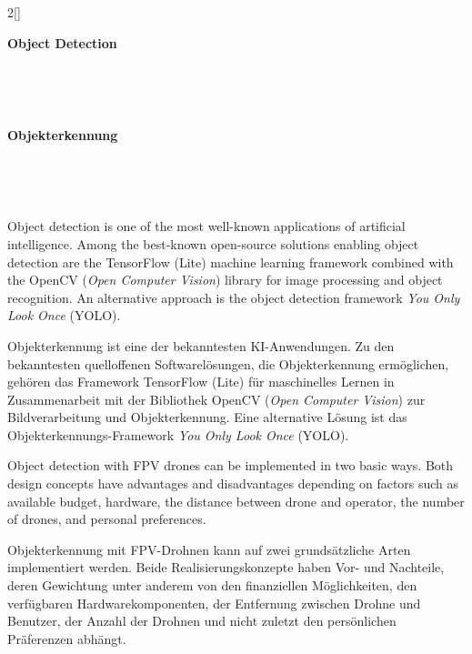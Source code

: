 \renewcommand{\deutschertitel}{Objekterkennung}
\renewcommand{\englischertitel}{Object Detection}
\chapter[\texorpdfstring{\protect{\vspace{2pt}\englischertitel}}{\englischertitel}]{}
\kapitel{\deutschertitel}
\thispagestyle{empty}

\label{KapitelObjekterkennung}

\begin{paracol}{2}[]

{\raggedright\huge\bfseries\sffamily \englischertitel \par\ } \\[1.8ex]

\switchcolumn

{\raggedright\huge\bfseries\sffamily \deutschertitel \par\ } \\[1.8ex]

\coleng

Object detection is one of the most well-known applications of artificial intelligence. Among the best-known open-source solutions enabling object detection are the TensorFlow (Lite) machine learning framework combined with the OpenCV (\textsl{Open Computer Vision}) library for image processing and object recognition. An alternative approach is the object detection framework \textsl{You Only Look Once} (YOLO).

\colger

Objekterkennung ist eine der bekanntesten KI-Anwendungen. Zu den bekanntesten quelloffenen Softwarelösungen, die Objekterkennung ermöglichen, gehören das Framework TensorFlow (Lite) für maschinelles Lernen in Zusammenarbeit mit der Bibliothek OpenCV (\textsl{Open Computer Vision}) zur Bildverarbeitung und Objekterkennung. Eine alternative Lösung ist das Objekterkennungs-Framework \textsl{You Only Look Once} (YOLO).

\coleng

Object detection with FPV drones can be implemented in two basic ways. Both design concepts have advantages and disadvantages depending on factors such as available budget, hardware, the distance between drone and operator, the number of drones, and personal preferences.

\colger

Objekterkennung mit FPV-Drohnen kann auf zwei grundsätzliche Arten implementiert werden. Beide Realisierungskonzepte haben Vor- und Nachteile, deren Gewichtung unter anderem von den finanziellen Möglichkeiten, den verfügbaren Hardwarekomponenten, der Entfernung zwischen Drohne und Benutzer, der Anzahl der Drohnen und nicht zuletzt den persönlichen Präferenzen abhängt.


\end{paracol}

